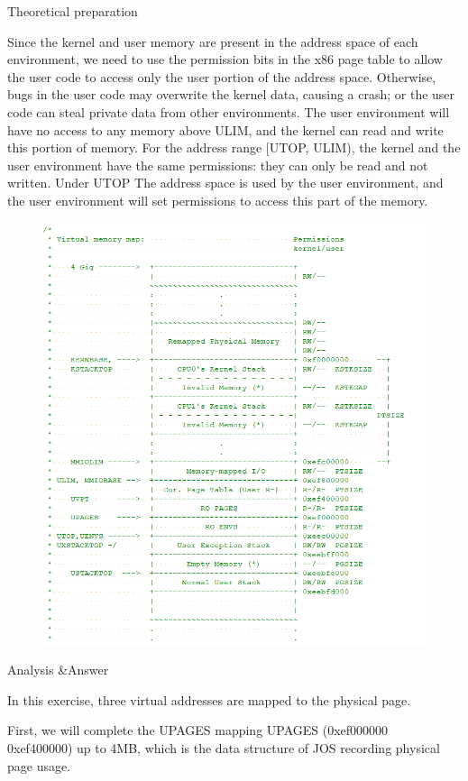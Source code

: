 \begin{flushleft}
{\Large Theoretical preparation}
\end{flushleft}

Since the kernel and user memory are present in the address space of each environment, we need to use the permission bits in the x86 page table to allow the user code to access only the user portion of the address space. Otherwise, bugs in the user code may overwrite the kernel data, causing a crash; or the user code can steal private data from other environments.
The user environment will have no access to any memory above ULIM, and the kernel can read and write this portion of memory. For the address range [UTOP, ULIM), the kernel and the user environment have the same permissions: they can only be read and not written. Under UTOP
The address space is used by the user environment, and the user environment will set permissions to access this part of the memory.
\begin{figure}[H]
\centering
\includegraphics[width=0.8\linewidth]{figure/mem_layout}
\end{figure}

\begin{flushleft}
{\Large Analysis \&Answer}
\end{flushleft}

In this exercise, three virtual addresses are mapped to the physical page.

First, we will complete the UPAGES mapping UPAGES (0xef000000 ~ 0xef400000) up to 4MB, which is the data structure of JOS recording physical page usage.

